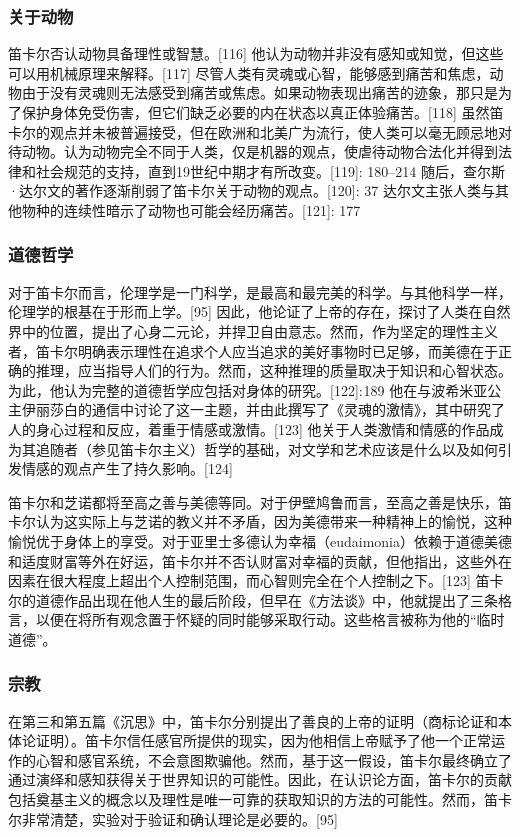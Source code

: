 \subsubsection{关于动物}
笛卡尔否认动物具备理性或智慧。[116] 他认为动物并非没有感知或知觉，但这些可以用机械原理来解释。[117] 尽管人类有灵魂或心智，能够感到痛苦和焦虑，动物由于没有灵魂则无法感受到痛苦或焦虑。如果动物表现出痛苦的迹象，那只是为了保护身体免受伤害，但它们缺乏必要的内在状态以真正体验痛苦。[118] 虽然笛卡尔的观点并未被普遍接受，但在欧洲和北美广为流行，使人类可以毫无顾忌地对待动物。认为动物完全不同于人类，仅是机器的观点，使虐待动物合法化并得到法律和社会规范的支持，直到19世纪中期才有所改变。[119]: 180–214 随后，查尔斯·达尔文的著作逐渐削弱了笛卡尔关于动物的观点。[120]: 37 达尔文主张人类与其他物种的连续性暗示了动物也可能会经历痛苦。[121]: 177
\subsubsection{道德哲学}
对于笛卡尔而言，伦理学是一门科学，是最高和最完美的科学。与其他科学一样，伦理学的根基在于形而上学。[95] 因此，他论证了上帝的存在，探讨了人类在自然界中的位置，提出了心身二元论，并捍卫自由意志。然而，作为坚定的理性主义者，笛卡尔明确表示理性在追求个人应当追求的美好事物时已足够，而美德在于正确的推理，应当指导人们的行为。然而，这种推理的质量取决于知识和心智状态。为此，他认为完整的道德哲学应包括对身体的研究。[122]: 189 他在与波希米亚公主伊丽莎白的通信中讨论了这一主题，并由此撰写了《灵魂的激情》，其中研究了人的身心过程和反应，着重于情感或激情。[123] 他关于人类激情和情感的作品成为其追随者（参见笛卡尔主义）哲学的基础，对文学和艺术应该是什么以及如何引发情感的观点产生了持久影响。[124]

笛卡尔和芝诺都将至高之善与美德等同。对于伊壁鸠鲁而言，至高之善是快乐，笛卡尔认为这实际上与芝诺的教义并不矛盾，因为美德带来一种精神上的愉悦，这种愉悦优于身体上的享受。对于亚里士多德认为幸福（eudaimonia）依赖于道德美德和适度财富等外在好运，笛卡尔并不否认财富对幸福的贡献，但他指出，这些外在因素在很大程度上超出个人控制范围，而心智则完全在个人控制之下。[123] 笛卡尔的道德作品出现在他人生的最后阶段，但早在《方法谈》中，他就提出了三条格言，以便在将所有观念置于怀疑的同时能够采取行动。这些格言被称为他的“临时道德”。
\subsubsection{宗教}
在第三和第五篇《沉思》中，笛卡尔分别提出了善良的上帝的证明（商标论证和本体论证明）。笛卡尔信任感官所提供的现实，因为他相信上帝赋予了他一个正常运作的心智和感官系统，不会意图欺骗他。然而，基于这一假设，笛卡尔最终确立了通过演绎和感知获得关于世界知识的可能性。因此，在认识论方面，笛卡尔的贡献包括奠基主义的概念以及理性是唯一可靠的获取知识的方法的可能性。然而，笛卡尔非常清楚，实验对于验证和确认理论是必要的。[95]

